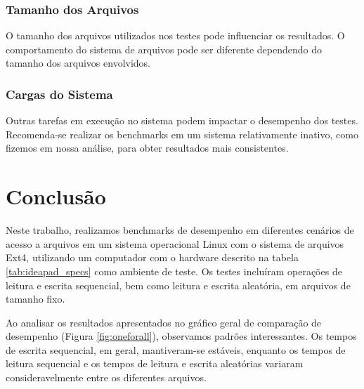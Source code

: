 \documentclass[
	12pt,				%
	openright,			%
	oneside,			%
	a4paper,			%
	chapter=TITLE,		%
	english,			%
	french,				%
	spanish,			%
	brazil				%
	]{abntex2}
\theoremstyle{definition}
\begin{document}
\subsection{Tamanho dos Arquivos}

O tamanho dos arquivos utilizados nos testes pode influenciar os resultados. 
O comportamento do sistema de arquivos pode ser diferente dependendo do 
tamanho dos arquivos envolvidos.




\subsection{Cargas do Sistema}

Outras tarefas em execução no sistema podem impactar o desempenho dos 
testes. Recomenda-se realizar os benchmarks em um sistema relativamente 
inativo, como fizemos em nossa análise, para obter resultados mais consistentes.

\chapter{Conclusão}

Neste trabalho, realizamos benchmarks de desempenho em diferentes cenários 
de acesso a arquivos em um sistema operacional Linux com o sistema de arquivos Ext4, 
utilizando um computador com o hardware descrito na tabela \ref{tab:ideapad_specs}  
como ambiente de teste. Os testes incluíram operações de leitura e escrita 
sequencial, bem como leitura e escrita aleatória, em arquivos de tamanho fixo.

Ao analisar os resultados apresentados no gráfico geral de comparação de desempenho 
(Figura \ref{fig:oneforall}), observamos padrões interessantes. Os tempos de 
escrita sequencial, em geral, mantiveram-se estáveis, enquanto os tempos de 
leitura sequencial e os tempos de leitura e escrita aleatórias variaram 
consideravelmente entre os diferentes arquivos.
\end{document}
